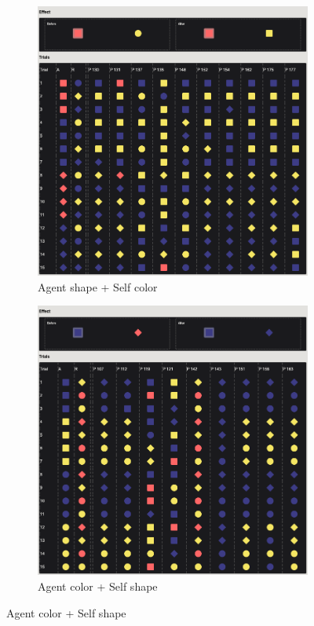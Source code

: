 \documentclass{article}
\begin{document}
\begin{figure}[h!]
  \begin{subfigure}[t]{0.32\textwidth}
  	\centering
  	\includegraphics[width=\linewidth]{rev_01} 
  	\caption{Agent shape + Self color} \label{fig:learn01}
  \end{subfigure}
  \begin{subfigure}[t]{0.32\textwidth}
  	\centering
  	\includegraphics[width=\linewidth]{rev_03} 
  	\caption{Agent color + Self shape} \label{fig:learn03}
  \end{subfigure}


\end{figure}
\end{document}
